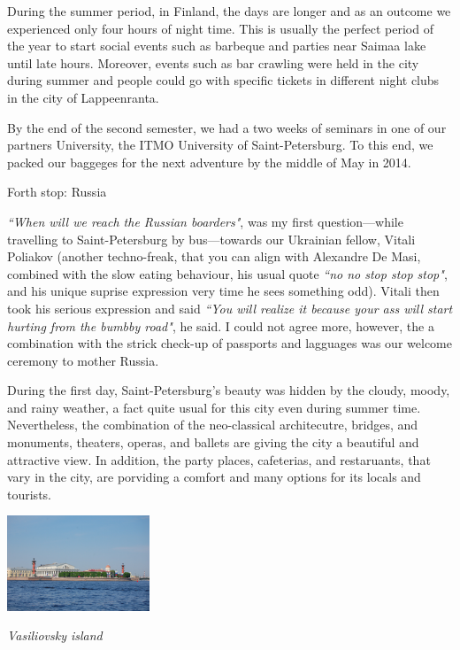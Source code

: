 \documentclass[10pt,a4paper]{article} %
\newcommand{\NewsItem}[1]{ %
\usefont{T1}{fvs}{n}{n} %
\vspace{24pt}\large #1\vspace{3pt} %
\par \normalsize \normalfont}
\begin{document}
\begin{multicols}{3}
During the summer period, in Finland, the days are longer and as an outcome we 
experienced only four hours of night time. 
This is usually the perfect period of the year to start social events such as 
barbeque and parties near Saimaa lake until late hours. 
Moreover, events such as bar crawling were held in the city during summer and people 
could go with specific tickets in different night clubs in the city of Lappeenranta.


By the end of the second semester, we had a two weeks of seminars in one of our 
partners University, the ITMO University of Saint-Petersburg. 
To this end, we packed our baggeges for the next adventure by the middle of May 
in 2014.	

\NewsItem{Forth stop: Russia}
%  
\textit{``When will we reach the Russian boarders"}, was my first question---while 
travelling to Saint-Petersburg by bus---towards our Ukrainian fellow, Vitali Poliakov 
(another techno-freak, that you can align with Alexandre De Masi, combined with 
the slow eating behaviour, his usual quote \textit{``no no stop stop stop"}, and  
his unique suprise expression very time he sees something odd). 
Vitali then took his serious expression and said \textit{``You will realize it 
	because your ass will start hurting from the bumbby road"}, he said. 
I could not agree more, however, the a combination with the strick check-up of 
passports and lagguages was our welcome ceremony to mother Russia.


During the first day, Saint-Petersburg's beauty was hidden by the cloudy, moody, 
and rainy weather, a fact quite usual for this city even during summer time.  
Nevertheless, the combination of the neo-classical architecutre, bridges, and 
monuments, theaters, operas, and ballets are giving the city a beautiful 
and attractive view. 
In addition, the party places, cafeterias, and restaruants, that vary in the 
city, are porviding a comfort and many options for its locals and tourists. 


\begin{center}
	\includegraphics[width=0.32\textwidth]{media/spb_1.jpg}
	\par\textit{Vasiliovsky island}
\end{center}



\end{multicols}
\end{document}

